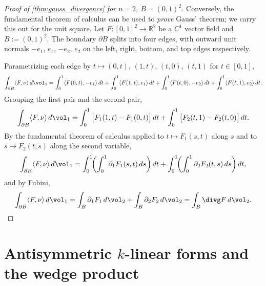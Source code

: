 \begin{proof}[Proof of \cref{thm:gauss_divergence} for $n=2$, $B = (0,1)^2$]
Conversely, the fundamental theorem of calculus can be used to \emph{prove} Gauss' theorem;
we carry this out for the unit square. Let $F : [0,1]^2 \to \mathbb{R}^2$ be a $C^1$ vector
field and $B := (0,1)^2$. The boundary $\partial B$ splits into four edges, with outward unit
normals $-e_1$, $e_1$, $-e_2$, $e_2$ on the left, right, bottom, and top edges respectively.

\begin{center}
\end{center}

Parametrizing each edge by $t \mapsto (0,t)$, $(1,t)$, $(t,0)$, $(t,1)$ for $t \in [0,1]$,
\[
\int_{\partial B} \langle F,\nu\rangle\,d\vol_1
  = \int_0^1 \langle F(0,t),-e_1\rangle\,dt + \int_0^1 \langle F(1,t),e_1\rangle\,dt
  + \int_0^1 \langle F(t,0),-e_2\rangle\,dt + \int_0^1 \langle F(t,1),e_2\rangle\,dt.
\]
Grouping the first pair and the second pair,
\[
\int_{\partial B} \langle F,\nu\rangle\,d\vol_1
  = \int_0^1 \big[F_1(1,t) - F_1(0,t)\big]\,dt + \int_0^1 \big[F_2(t,1) - F_2(t,0)\big]\,dt.
\]
By the fundamental theorem of calculus applied to $t \mapsto F_1(s,t)$ along $s$ and to
$s \mapsto F_2(t,s)$ along the second variable,
\[
\int_{\partial B} \langle F,\nu\rangle\,d\vol_1
  = \int_0^1\!\!\left(\int_0^1 \partial_1 F_1(s,t)\,ds\right) dt
  + \int_0^1\!\!\left(\int_0^1 \partial_2 F_2(t,s)\,ds\right) dt,
\]
and by Fubini,
\[
\int_{\partial B} \langle F,\nu\rangle\,d\vol_1
  = \int_B \partial_1 F_1\,d\vol_2 + \int_B \partial_2 F_2\,d\vol_2
  = \int_B \divg F\,d\vol_2. \qedhere
\]
\end{proof}

\section{Antisymmetric \texorpdfstring{$k$}{k}-linear forms and the wedge product}
\label{sec:antisymmetric_forms}

